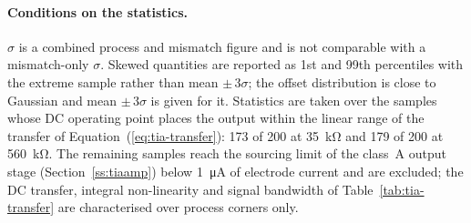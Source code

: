\paragraph{Conditions on the statistics.} $\sigma$ is a combined process and mismatch
figure and is not comparable with a mismatch-only $\sigma$. Skewed quantities are
reported as 1st and 99th percentiles with the extreme sample rather than mean
$\pm\,3\sigma$; the offset distribution is close to Gaussian and mean $\pm\,3\sigma$ is
given for it. Statistics are taken over the samples whose DC operating point places the
output within the linear range of the transfer of Equation~(\ref{eq:tia-transfer}): 173
of 200 at \SI{35}{\kilo\ohm} and 179 of 200 at \SI{560}{\kilo\ohm}. The remaining
samples reach the sourcing limit of the class~A output stage
(Section~\ref{ss:tiaamp}) below \SI{1}{\micro\ampere} of electrode current and are
excluded; the DC transfer, integral non-linearity and signal bandwidth of
Table~\ref{tab:tia-transfer} are characterised over process corners only.
